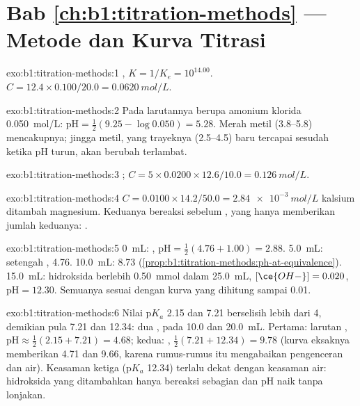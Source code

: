 \section*{Bab \ref{ch:b1:titration-methods} --- Metode dan Kurva Titrasi}

\begin{solution}{exo:b1:titration-methods:1}
, $K = 1/K_e = 10^{14.00}$. $C = 12.4 \times
0.100/20.0 = \qty{0.0620}{mol/L}$.
\end{solution}

\begin{solution}{exo:b1:titration-methods:2}
Pada  larutannya berupa amonium klorida \qty{0.050}{mol/L}:
$\mathrm{pH} = \frac12(9.25 - \log 0.050) = 5.28$. Merah metil
(3.8--5.8) mencakupnya; jingga metil, yang trayeknya (2.5--4.5) baru
tercapai sesudah  ketika pH turun, akan berubah terlambat.
\end{solution}

\begin{solution}{exo:b1:titration-methods:3}
;
$C = 5 \times 0.0200 \times 12.6/10.0 = \qty{0.126}{mol/L}$.
\end{solution}

\begin{solution}{exo:b1:titration-methods:4}
$C = 0.0100 \times 14.2/50.0 = \qty{2.84e-3}{mol/L}$ kalsium ditambah
magnesium. Keduanya bereaksi sebelum , yang hanya memberikan
jumlah keduanya: .
\end{solution}

\begin{solution}{exo:b1:titration-methods:5}
0~mL: , $\mathrm{pH} = \frac12(4.76 + 1.00) = 2.88$. 5.0~mL:
setengah , 4.76. 10.0~mL: 8.73
(\cref{prop:b1:titration-methods:ph-at-equivalence}). 15.0~mL: hidroksida
berlebih \qty{0.50}{mmol} dalam \qty{25.0}{mL}, $[\ce{OH-}] = 0.020$,
$\mathrm{pH} = 12.30$. Semuanya sesuai dengan kurva yang dihitung sampai
0.01.
\end{solution}

\begin{solution}{exo:b1:titration-methods:6}
Nilai $\mathrm{p}K_a$ 2.15 dan 7.21 berselisih lebih dari 4, demikian
pula 7.21 dan 12.34: dua , pada 10.0 dan \qty{20.0}{mL}.
Pertama: larutan , $\mathrm{pH} \approx \frac12(2.15 + 7.21) = 4.68$;
kedua: , $\frac12(7.21 + 12.34) = 9.78$ (kurva eksaknya
memberikan 4.71 dan 9.66, karena rumus-rumus itu mengabaikan pengenceran
dan air). Keasaman ketiga ($\mathrm{p}K_a$ 12.34) terlalu dekat dengan
keasaman air: hidroksida yang ditambahkan hanya bereaksi sebagian dan pH
naik tanpa lonjakan.
\end{solution}

